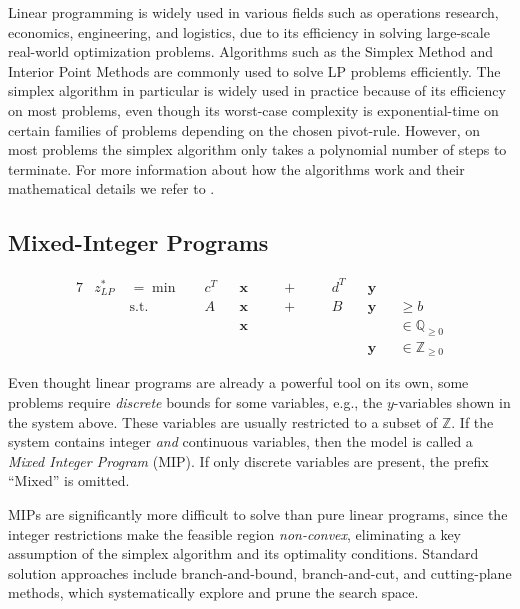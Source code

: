 		Linear programming is widely used in various fields such as operations research, economics, engineering, and logistics, due to its efficiency in solving large-scale real-world optimization problems. Algorithms such as the Simplex Method and Interior Point Methods are commonly used to solve LP problems efficiently.
		The simplex algorithm in particular is widely used in practice because of its efficiency on most problems, even though its worst-case complexity is exponential-time on certain families of problems depending on the chosen pivot-rule. 
		However, on most problems the simplex algorithm only takes a polynomial number of steps to terminate.
		For more information about how the algorithms work and their mathematical details we refer to \cite{BranchPrice}.
		
		\clearpage

		\subsection{Mixed-Integer Programs}
			\begin{alignat*}{7}
				&z^*_{LP} \; &={}	\min	&\quad  c^T && \mathbf{x} && \quad+\quad && d^T && \mathbf{y} \\
				&& \text{s.t.} & \quad A && \mathbf{x} && \quad+\quad  && B && \mathbf{y} && \geq b \\
				&&&&& \mathbf{x} &&&&&& &&\in \mathbb{Q}_{\geq 0} \\
				&&&&&&&&&&& \mathbf{y} &&\in \mathbb{Z}_{\geq 0}
			\end{alignat*}
			
			Even thought linear programs are already a powerful tool on its own, some problems require \textit{discrete} bounds for some variables, e.g., the $y$-variables shown in the system above. These variables are usually restricted to a subset of $\mathbb{Z}$.
			If the system contains integer \textit{and} continuous variables, then the model is called a \textit{Mixed Integer Program} (MIP).
			If only discrete variables are present, the prefix \enquote{Mixed} is omitted.
			
			MIPs are significantly more difficult to solve than pure linear programs, since the integer restrictions make the feasible region \textit{non-convex}, eliminating a key assumption of the simplex algorithm and its optimality conditions. Standard solution approaches include branch-and-bound, branch-and-cut, and cutting-plane methods, which systematically explore and prune the search space.

